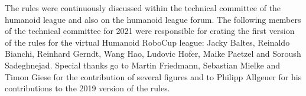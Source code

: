 The rules were continuously discussed within the technical committee of the
humanoid league and also on the humanoid league forum.
The following members of the technical committee for 2021 were responsible for
crating the first version of the rules for the virtual Humanoid RoboCup league: Jacky Baltes, Reinaldo Bianchi, Reinhard Gerndt, Wang Hao,
Ludovic Hofer, Maike Paetzel and Soroush Sadeghnejad.
Special thanks go to Martin Friedmann, Sebastian Mielke and Timon Giese for the
contribution of several figures and to Philipp Allgeuer for his contributions to
the 2019 version of the rules.
